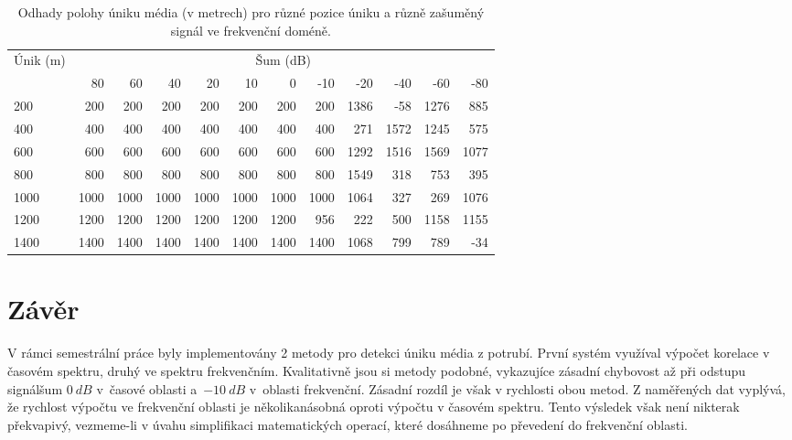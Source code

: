 \begin{table}[htb]
    \centering

    \begin{tabular}{lrrrrrrrrrrr}
        \toprule
        
        \multirow{2}{*}{Únik (m)}   & \multicolumn{11}{c}{Šum (dB)}                                                         \\ \cmidrule[\lightrulewidth](lr){2-12}
                                    & 80    & 60    & 40    & 20    & 10     & 0    & -10   & -20   & -40   & -60   & -80   \\ \midrule

         200                        &  200  &  200  &  200  &  200  &  200  &  200  &  200  & 1386  &  -58  & 1276  &  885  \\
         400                        &  400	&  400  &  400  &  400  &  400  &  400  &  400  &  271  & 1572  & 1245  &  575  \\
         600                        &  600	&  600  &  600  &  600  &  600  &  600  &  600  & 1292  & 1516  & 1569  & 1077  \\
         800                        &  800	&  800  &  800  &  800  &  800  &  800  &  800  & 1549  &  318  &  753  &  395  \\
        1000                        & 1000	& 1000  & 1000  & 1000  & 1000  & 1000  & 1000  & 1064  &  327  &  269  & 1076  \\
        1200                        & 1200	& 1200  & 1200  & 1200  & 1200  & 1200  &  956  &  222  &  500  & 1158  & 1155  \\
        1400                        & 1400	& 1400  & 1400  & 1400  & 1400  & 1400  & 1400  & 1068  &  799  &  789  &  -34  \\

        \bottomrule
    \end{tabular}

    \caption{Odhady polohy úniku média (v metrech) pro různé pozice úniku a různě zašuměný signál ve frekvenční doméně.}
    \label{table:table3}
\end{table}
\FloatBarrier

\section{Závěr}

V rámci semestrální práce byly implementovány 2 metody pro detekci úniku média z potrubí.
První systém využíval výpočet korelace v časovém spektru, druhý ve spektru frekvenčním.
Kvalitativně jsou si metody podobné, vykazujíce zásadní chybovost až při odstupu signál\/šum \( 0 \: dB \) v~časové oblasti a~\( -10 \: dB \) v~oblasti frekvenční.
Zásadní rozdíl je však v rychlosti obou metod.
Z naměřených dat vyplývá, že rychlost výpočtu ve frekvenční oblasti je několikanásobná oproti výpočtu v časovém spektru.
Tento výsledek však není nikterak překvapivý, vezmeme-li v úvahu simplifikaci matematických operací, které dosáhneme po převedení do frekvenční oblasti.
